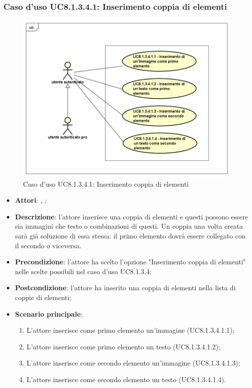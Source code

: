 	\subsubsection{Caso d'uso UC8.1.3.4.1: Inserimento coppia di elementi}
	\label{UC8.1.3.4.1}
	\begin{figure}[h]
		\centering
		\includegraphics[scale=0.5,keepaspectratio]{UML/UC8_1_3_4_1.png}
		\caption{Caso d'uso UC8.1.3.4.1: Inserimento coppia di elementi}
	\end{figure}
	\FloatBarrier
	\begin{itemize}
		\item \textbf{Attori}: \uau, \uaupro;
		\item \textbf{Descrizione}: l'attore inserisce una coppia di elementi e questi possono essere sia immagini che testo o combinazioni di questi. Un coppia una volta creata sarà già soluzione di essa stessa: il primo elemento dovrà essere collegato con il secondo o viceversa. 
		\item \textbf{Precondizione}: l'attore ha scelto l'opzione "Inserimento coppia di elementi" nelle scelte possibili nel caso d'uso UC8.1.3.4;
		\item \textbf{Postcondizione}: l'attore ha inserito una coppia di elementi nella lista di coppie di elementi; 
		\item \textbf{Scenario principale}: 
		\begin{enumerate}
			\item L'attore inserisce come primo elemento un'immagine (UC8.1.3.4.1.1);
			\item L'attore inserisce come primo elemento un testo (UC8.1.3.4.1.2);
			\item L'attore inserisce come secondo elemento un'immagine (UC8.1.3.4.1.3);
			\item L'attore inserisce come secondo elemento un testo (UC8.1.3.4.1.4).	
		\end{enumerate}
	\end{itemize}
	
